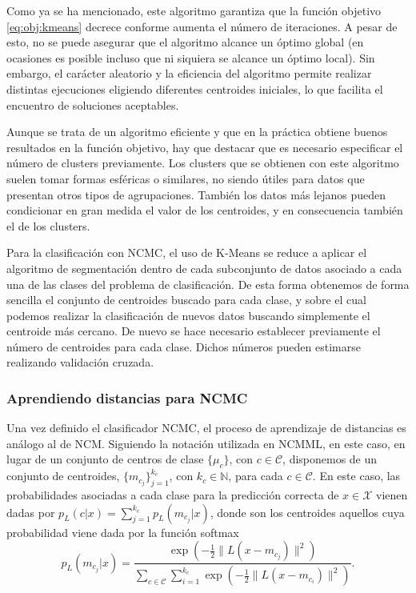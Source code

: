 Como ya se ha mencionado, este algoritmo garantiza que la función objetivo \ref{eq:obj:kmeans} decrece conforme aumenta el número de iteraciones. A pesar de esto, no se puede asegurar que el algoritmo alcance un óptimo global (en ocasiones es posible incluso que ni siquiera se alcance un óptimo local). Sin embargo, el carácter aleatorio y la eficiencia del algoritmo permite realizar distintas ejecuciones eligiendo diferentes centroides iniciales, lo que facilita el encuentro de soluciones aceptables. 

Aunque se trata de un algoritmo eficiente y que en la práctica obtiene buenos resultados en la función objetivo, hay que destacar que es necesario especificar el número de clusters previamente. Los clusters que se obtienen con este algoritmo suelen tomar formas esféricas o similares, no siendo útiles para datos que presentan otros tipos de agrupaciones. También los datos más lejanos pueden condicionar en gran medida el valor de los centroides, y en consecuencia también el de los clusters.

Para la clasificación con NCMC, el uso de K-Means se reduce a aplicar el algoritmo de segmentación dentro de cada subconjunto de datos asociado a cada una de las clases del problema de clasificación. De esta forma obtenemos de forma sencilla el conjunto de centroides buscado para cada clase, y sobre el cual podemos realizar la clasificación de nuevos datos buscando simplemente el centroide más cercano. De nuevo se hace necesario establecer previamente el número de centroides para cada clase. Dichos números pueden estimarse realizando validación cruzada. 


\subsubsection{Aprendiendo distancias para NCMC}

Una vez definido el clasificador NCMC, el proceso de aprendizaje de distancias es análogo al de NCM. Siguiendo la notación utilizada en NCMML, en este caso, en lugar de un conjunto de centros de clase $\{\mu_c\}$, con $c \in \mathcal{C}$, disponemos de un conjunto de centroides, $\{m_{c_j}\}_{j=1}^{k_c}$, con $k_c \in \mathbb{N}$, para cada $c \in \mathcal{C}$. En este caso, las probabilidades asociadas a cada clase para la predicción correcta de $x \in \mathcal{X}$ vienen dadas por $p_L(c|x) = \sum_{j=1}^{k_c} p_L(m_{c_j}|x)$, donde son los centroides aquellos cuya probabilidad viene dada por la función softmax
\begin{equation}
    p_L(m_{c_j}|x) = \frac{\exp\left( -\frac{1}{2} \|L(x-m_{c_j})\|^2 \right)}{ \sum\limits_{c \in \mathcal{C}} \sum\limits_{i=1}^{k_c} \exp\left( -\frac{1}{2} \|L(x-m_{c_i})\|^2 \right) }.
\end{equation}

